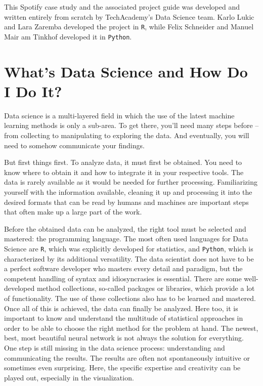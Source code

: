 \documentclass[
  11pt,
]{book}
\begin{document}
This Spotify case study and the associated project guide was developed and written entirely from scratch by TechAcademy's Data Science team. Karlo Lukic and Lara Zaremba developed the project in \texttt{R}, while Felix Schneider and Manuel Mair am Tinkhof developed it in \texttt{Python}.

\hypertarget{whats-data-science-and-how-do-i-do-it}{%
\chapter{What's Data Science and How Do I Do It?}\label{whats-data-science-and-how-do-i-do-it}}

Data science is a multi-layered field in which the use of the latest machine learning methods is only a sub-area. To get there, you'll need many steps before -- from collecting to manipulating to exploring the data. And eventually, you will need to somehow communicate your findings.

But first things first. To analyze data, it must first be obtained. You need to know where to obtain it and how to integrate it in your respective tools. The data is rarely available as it would be needed for further processing. Familiarizing yourself with the information available, cleaning it up and processing it into the desired formats that can be read by humans and machines are important steps that often make up a large part of the work.

Before the obtained data can be analyzed, the right tool must be selected and mastered: the programming language. The most often used languages for Data Science are \texttt{R}, which was explicitly developed for statistics, and \texttt{Python}, which is characterized by its additional versatility. The data scientist does not have to be a perfect software developer who masters every detail and paradigm, but the competent handling of syntax and idiosyncrasies is essential.
There are some well-developed method collections, so-called packages or libraries, which provide a lot of functionality. The use of these collections also has to be learned and mastered.
Once all of this is achieved, the data can finally be analyzed. Here too, it is important to know and understand the multitude of statistical approaches in order to be able to choose the right method for the problem at hand. The newest, best, most beautiful neural network is not always the solution for everything.\\
One step is still missing in the data science process: understanding and communicating the results. The results are often not spontaneously intuitive or sometimes even surprising. Here, the specific expertise and creativity can be played out, especially in the visualization.
\end{document}
